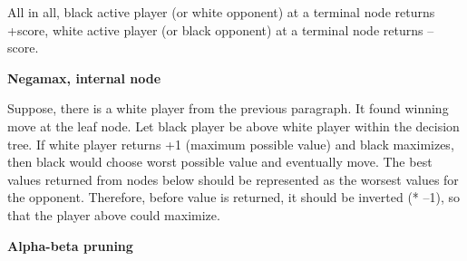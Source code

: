 \vspace{0.5em}

All in all, black active player (or white opponent) at a terminal node returns
+score, white active player (or black opponent) at a terminal node returns
--score.

\vspace{0.5em}

\textbf{Negamax, internal node}

\vspace{0.5em}

Suppose, there is a white player from the previous paragraph. It found winning
move at the leaf node. Let black player be above white player within the
decision tree. If white player returns +1 (maximum possible value) and black
maximizes, then black would choose worst possible value and eventually move.
The best values returned from nodes below should be represented as the worsest
values for the opponent. Therefore, before value is returned, it should be
inverted (* --1), so that the player above could maximize.

\vspace{0.5em}

\textbf{Alpha-beta pruning}

